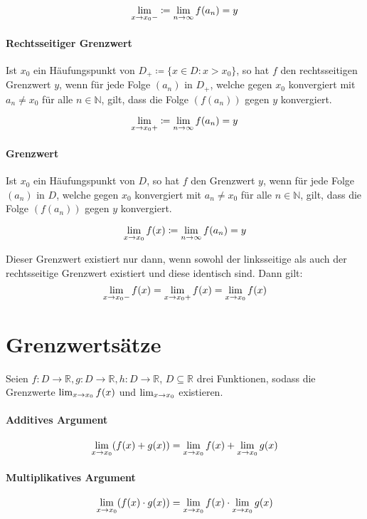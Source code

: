 			\[ \lim _ { x \rightarrow x _ 0 - } \coloneqq \lim_{n \to \infty} f(a _ n) = y \]

		\paragraph{Rechtsseitiger Grenzwert}
			Ist $ x _ 0 $ ein Häufungspunkt von $ D _ + \coloneqq \{ x \in D : x > x _ 0 \} $, so hat $ f $ den rechtsseitigen Grenzwert $ y $, wenn für jede Folge $ (a _ n) $ in $ D _ + $, welche gegen $ x _ 0 $ konvergiert mit $ a _ n \neq x _ 0 $ für alle $ n \in \mathbb{N} $, gilt, dass die Folge $ (f(a _ n)) $ gegen $ y $ konvergiert.

			\[ \lim _ { x \rightarrow x _ 0 + } \coloneqq \lim_{n \to \infty} f(a _ n) = y \]

		\paragraph{Grenzwert}
			Ist $ x _ 0 $ ein Häufungspunkt von $ D $, so hat $ f $ den Grenzwert $ y $, wenn für jede Folge $ (a _ n) $ in $ D $, welche gegen $ x _ 0 $ konvergiert mit $ a _ n \neq x _ 0 $ für alle $ n \in \mathbb{N} $, gilt, dass die Folge $ (f(a _ n)) $ gegen $ y $ konvergiert.

			\[ \lim_{x \to x_0 } f(x) \coloneqq \lim_{n \to \infty} f(a _ n) = y \]

			Dieser Grenzwert existiert nur dann, wenn sowohl der linksseitige als auch der rechtsseitige Grenzwert existiert und diese identisch sind. Dann gilt:
			\begin{equation*}
				\lim _ { x \rightarrow x _ 0 - } f(x) = \lim _ { x \rightarrow x _ 0 + } f(x) = \lim_{x \to x_0 } f(x)
			\end{equation*}

	\section{Grenzwertsätze}
		Seien $ f : D \rightarrow \mathbb{R}, g : D \rightarrow \mathbb{R}, h : D \rightarrow \mathbb{R} $, $ D \subseteq \mathbb{R} $ drei Funktionen, sodass die Grenzwerte $ \lim_{x \to x_0 } f(x) $ und $ \lim_{x \to x_0 } $ existieren.

		\paragraph{Additives Argument}
			\[ \lim_{x \to x_0 } (f(x) + g(x)) = \lim_{x \to x_0 } f(x) + \lim_{x \to x_0 } g(x) \]

		\paragraph{Multiplikatives Argument}
			\[ \lim_{x \to x_0 } (f(x) \cdot g(x)) = \lim_{x \to x_0 } f(x) \cdot \lim_{x \to x_0 } g(x) \]

